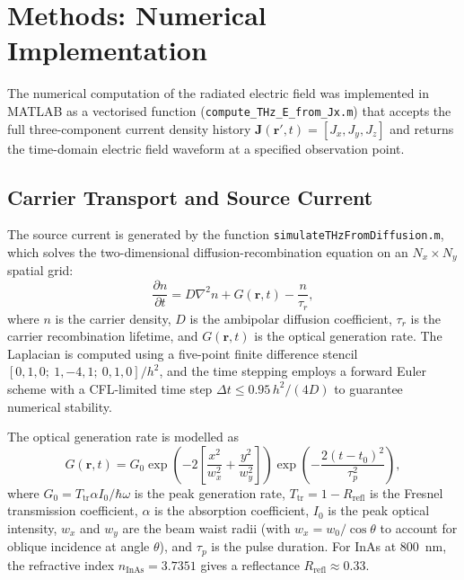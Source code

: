 \documentclass[12pt]{interim_report}
\begin{document}
\section{Methods: Numerical Implementation}

The numerical computation of the radiated electric field was implemented in MATLAB as a vectorised function (\texttt{compute\_THz\_E\_from\_Jx.m}) that accepts the full three-component current density history $\mathbf{J}(\mathbf{r}', t) = [J_x, J_y, J_z]$ and returns the time-domain electric field waveform at a specified observation point.

\subsection{Carrier Transport and Source Current}
The source current is generated by the function \texttt{simulateTHzFromDiffusion.m}, which solves the two-dimensional diffusion-recombination equation on an $N_x \times N_y$ spatial grid:
\begin{equation}
    \frac{\partial n}{\partial t} = D \nabla^2 n + G(\mathbf{r}, t) - \frac{n}{\tau_r},
    \label{eq:diffusion}
\end{equation}
where $n$ is the carrier density, $D$ is the ambipolar diffusion coefficient, $\tau_r$ is the carrier recombination lifetime, and $G(\mathbf{r}, t)$ is the optical generation rate. The Laplacian is computed using a five-point finite difference stencil $[0,1,0;\ 1,-4,1;\ 0,1,0]/h^2$, and the time stepping employs a forward Euler scheme with a CFL-limited time step $\Delta t \leq 0.95 \, h^2 / (4D)$ to guarantee numerical stability.

The optical generation rate is modelled as
\begin{equation}
    G(\mathbf{r}, t) = G_0 \exp\!\left(-2\left[\frac{x^2}{w_x^2} + \frac{y^2}{w_y^2}\right]\right) \exp\!\left(-\frac{2(t - t_0)^2}{\tau_p^2}\right),
\end{equation}
where $G_0 = T_{\mathrm{tr}} \alpha I_0 / \hbar\omega$ is the peak generation rate, $T_{\mathrm{tr}} = 1 - R_{\mathrm{refl}}$ is the Fresnel transmission coefficient, $\alpha$ is the absorption coefficient, $I_0$ is the peak optical intensity, $w_x$ and $w_y$ are the beam waist radii (with $w_x = w_0/\cos\theta$ to account for oblique incidence at angle $\theta$), and $\tau_p$ is the pulse duration. For InAs at 800~nm, the refractive index $n_{\mathrm{InAs}} = 3.7351$ gives a reflectance $R_{\mathrm{refl}} \approx 0.33$.
\end{document}
